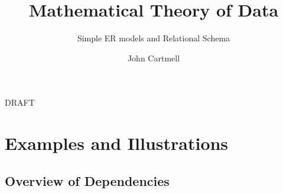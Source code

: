 \documentclass[10pt,a4paper]{scrartcl}
\begin{document}
\title{Mathematical Theory of Data}
\subtitle{Simple ER models and Relational Schema}
\author{John Cartmell}
\maketitle
\begin{center}
DRAFT
\end{center}







\newpage
\appendix



\section{Examples and Illustrations}







\begin{landscape}
\section{Overview of Dependencies}

\end{landscape}

 

\printindex[definitions]

\printindex[lemmas]
	 
\end{document}
